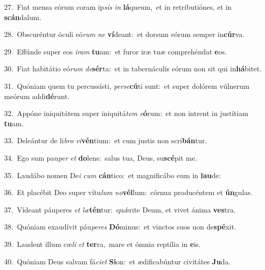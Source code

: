 {\numbfont\textcolor{\numbcolor}{27.}}~Fiat mensa eórum coram ip\textit{sis} \textit{in} \textbf{lá}\-queum,~\star et in retributiónes, et in \textbf{scán}\-dalum.\par
{\numbfont\textcolor{\numbcolor}{28.}}~Obscuréntur óculi eó\textit{rum} \textit{ne} \textbf{ví}\-deant:~\star et dorsum eórum semper in\-\textbf{cúr}\-va.\par
{\numbfont\textcolor{\numbcolor}{29.}}~Effúnde super eos \textit{i}\-\textit{ram} \textbf{tu}\-am:~\star et furor iræ tuæ comprehéndat \textbf{e}\-os.\par
{\numbfont\textcolor{\numbcolor}{30.}}~Fiat habitátio eó\textit{rum} \textit{de}\-\textbf{sér}ta:~\star et in tabernáculis eórum non sit qui in\-\textbf{há}\-bitet.\par
{\numbfont\textcolor{\numbcolor}{31.}}~Quóniam quem tu percussísti, \textit{per}\-\textit{se}\textbf{cú}ti sunt:~\star et super dolórem vúlnerum meórum addi\-\textbf{dé}\-runt.\par
{\numbfont\textcolor{\numbcolor}{32.}}~Appóne iniquitátem super iniquitá\textit{tem} \textit{e}\-\textbf{ó}rum:~\star et non intrent in justítiam \textbf{tu}\-am.\par
{\numbfont\textcolor{\numbcolor}{33.}}~Deleántur de li\textit{bro} \textit{vi}\-\textbf{vén}tium:~\star et cum justis non scri\-\textbf{bán}\-tur.\par
{\numbfont\textcolor{\numbcolor}{34.}}~Ego sum pau\textit{per} \textit{et} \textbf{do}\-lens:~\star salus tua, Deus, su\-\textbf{scé}\-pit me.\par
{\numbfont\textcolor{\numbcolor}{35.}}~Laudábo nomen De\textit{i} \textit{cum} \textbf{cán}\-tico:~\star et magnificábo eum in \textbf{lau}\-de:\par
{\numbfont\textcolor{\numbcolor}{36.}}~Et placébit Deo super vítu\textit{lum} \textit{no}\-\textbf{vél}lum:~\star córnua producéntem et \textbf{ún}\-gulas.\par
{\numbfont\textcolor{\numbcolor}{37.}}~Vídeant páuperes \textit{et} \textit{læ}\-\textbf{tén}tur:~\star quǽrite Deum, et vivet ánima \textbf{ves}\-tra.\par
{\numbfont\textcolor{\numbcolor}{38.}}~Quóniam exaudívit páu\-\textit{pe}\-\textit{res} \textbf{Dó}\-minus:~\star et vinctos suos non de\-\textbf{spé}\-xit.\par
{\numbfont\textcolor{\numbcolor}{39.}}~Laudent illum cæ\textit{li} \textit{et} \textbf{ter}\-ra,~\star mare et ómnia reptília in \textbf{e}\-is.\par
{\numbfont\textcolor{\numbcolor}{40.}}~Quóniam Deus salvam fá\-\textit{ci}\-\textit{et} \textbf{Si}\-on:~\star et ædificabúntur civitátes \textbf{Ju}\-da.\par
